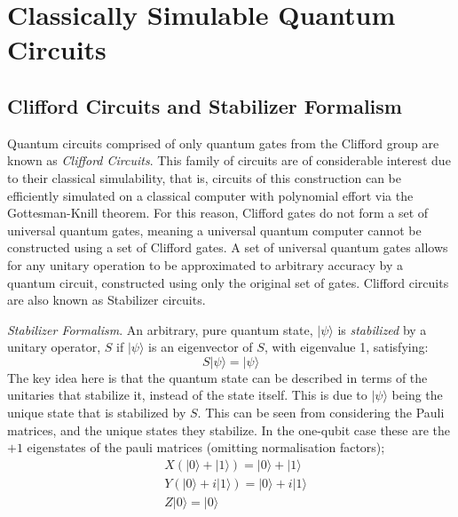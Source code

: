\section{Classically Simulable Quantum Circuits}
\subsection{Clifford Circuits and Stabilizer Formalism}

Quantum circuits comprised of only quantum gates from the Clifford group are known as \textit{Clifford Circuits}.
This family of circuits are of considerable interest due to their classical simulability, that is,
circuits of this construction can be efficiently simulated on a classical computer with polynomial
effort via the Gottesman-Knill theorem. For this reason, Clifford gates do not form
a set of universal quantum gates, meaning a universal quantum computer cannot be constructed using a set
of Clifford gates. A set of universal quantum gates allows for any unitary operation to be approximated to
arbitrary accuracy by a quantum circuit, constructed using only the original set of gates. Clifford
circuits are also known as Stabilizer circuits.

\textit{Stabilizer Formalism}. An arbitrary, pure quantum state, $|\psi\rangle$ is \textit{stabilized} by
a unitary operator, $S$ if $|\psi\rangle$  is an eigenvector of $S$, with eigenvalue 1, satisfying:
\begin{equation}
    S|\psi\rangle = |\psi\rangle
\end{equation}
The key idea here is that the quantum state can be described in terms of the unitaries that stabilize it, instead of the state itself.
This is due to $|\psi\rangle$ being the unique state that is stabilized by $S$. \cite{PhysRevA.70.052328}
This can be seen from considering the Pauli matrices, and the unique states they stabilize. In the one-qubit case these are
the $+1$ eigenstates of the pauli matrices (omitting normalisation factors);
\begin{align}
     & X(|0\rangle + |1\rangle) = |0\rangle + |1\rangle   \\
     & Y(|0\rangle + i|1\rangle) = |0\rangle + i|1\rangle \\
     & Z|0\rangle = |0\rangle
\end{align}

